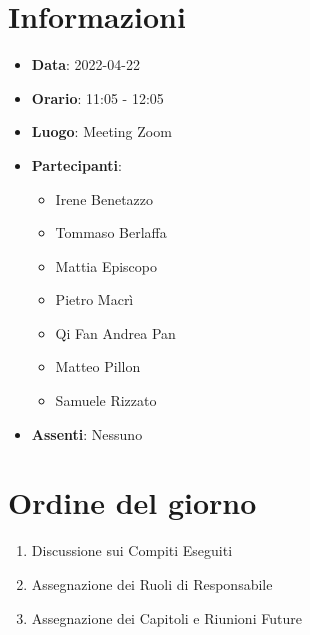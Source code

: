\section{Informazioni}
	\begin{itemize}
		\item \textbf{Data}: 2022-04-22     %
		\item \textbf{Orario}: 11:05 - 12:05             %
		\item \textbf{Luogo}: Meeting Zoom
		\item \textbf{Partecipanti}:
		\begin{itemize}
			\item Irene Benetazzo
			\item Tommaso Berlaffa
			\item Mattia Episcopo
			\item Pietro Macrì
			\item Qi Fan Andrea Pan
			\item Matteo Pillon
			\item Samuele Rizzato
		\end{itemize}
        \item \textbf{Assenti}: Nessuno
	\end{itemize}
    
	\section{Ordine del giorno}
	\begin{enumerate}
		\item Discussione sui Compiti Eseguiti
		\item Assegnazione dei Ruoli di Responsabile
		\item Assegnazione dei Capitoli e Riunioni Future
	\end{enumerate}
	\newpage